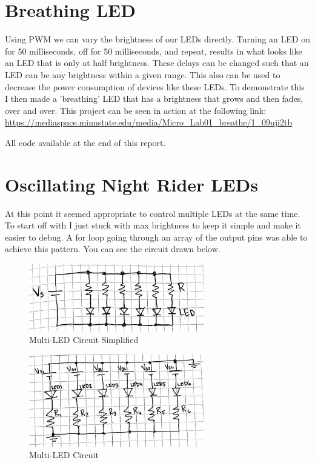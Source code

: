 \documentclass[prb,preprint]{revtex4-1}
\begin{document}
\section{Breathing LED}
Using PWM we can vary the brightness of our LEDs directly. Turning an LED on for 50 milliseconds, off for 50 milliseconds, and repeat, results in what looks like an LED that is only at half brightness. These delays can be changed such that an LED can be any brightness within a given range. This also can be used to decrease the power consumption of devices like these LEDs. To demonstrate this I then made a 'breathing' LED that has a brightness that grows and then fades, over and over. This project can be seen in action at the following link: \url{https://mediaspace.minnstate.edu/media/Micro_Lab01_breathe/1_09uji2tb}

All code available at the end of this report.


\section{Oscillating Night Rider LEDs}
At this point it seemed appropriate to control multiple LEDs at the same time. To start off with I just stuck with max brightness to keep it simple and make it easier to debug. A for loop going through an array of the output pins was able to achieve this pattern. You can see the circuit drawn below.

\begin{figure}[ht]
	\centering
	\includegraphics[width=3in]{figure2.png}
	\caption{Multi-LED Circuit Simplified}
	\label{fig1}
\end{figure}

\begin{figure}[ht]
	\centering
	\includegraphics[width=3in]{figure3.png}
	\caption{Multi-LED Circuit}
	\label{fig1}
\end{figure}
\end{document}
